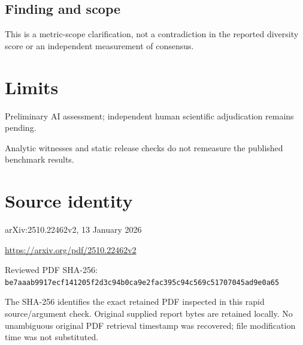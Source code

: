 \documentclass[11pt]{article}
\begin{document}
\subsection*{Finding and scope}

This is a metric-scope clarification, not a contradiction in the reported diversity score or an independent measurement of consensus.

\section*{Limits}

Preliminary AI assessment; independent human scientific adjudication remains pending.\par

Analytic witnesses and static release checks do not remeasure the published benchmark results.\par

\section*{Source identity}

arXiv:2510.22462v2, 13 January 2026

\url{https://arxiv.org/pdf/2510.22462v2}

Reviewed PDF SHA-256: \nolinkurl{be7aaab9917ecf141205f2d3c94b0ca9e2fac395c94c569c51707045ad9e0a65}

The SHA-256 identifies the exact retained PDF inspected in this rapid source/argument check. Original supplied report bytes are retained locally. No unambiguous original PDF retrieval timestamp was recovered; file modification time was not substituted.
\end{document}
